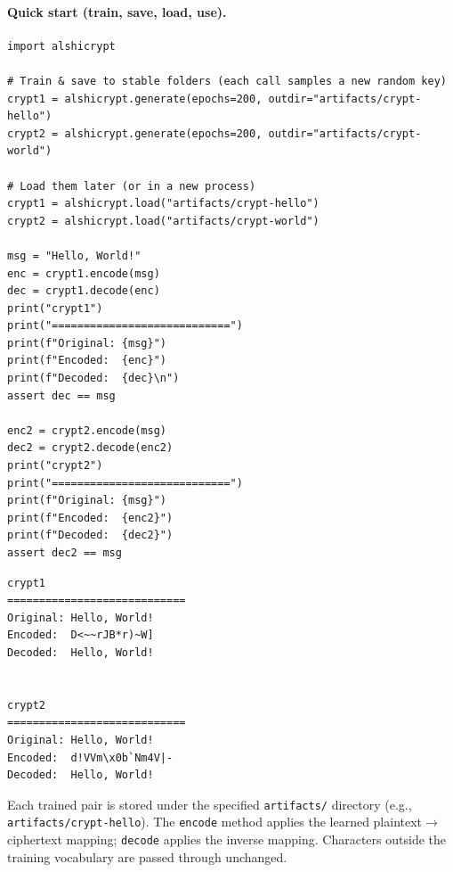 \documentclass[12pt]{article}
\theoremstyle{plain}
\theoremstyle{remark}
\begin{document}
\paragraph{Quick start (train, save, load, use).}
\begin{verbatim}
import alshicrypt

# Train & save to stable folders (each call samples a new random key)
crypt1 = alshicrypt.generate(epochs=200, outdir="artifacts/crypt-hello")
crypt2 = alshicrypt.generate(epochs=200, outdir="artifacts/crypt-world")

# Load them later (or in a new process)
crypt1 = alshicrypt.load("artifacts/crypt-hello")
crypt2 = alshicrypt.load("artifacts/crypt-world")

msg = "Hello, World!"
enc = crypt1.encode(msg)
dec = crypt1.decode(enc)
print("crypt1")
print("============================")
print(f"Original: {msg}")
print(f"Encoded:  {enc}")
print(f"Decoded:  {dec}\n")
assert dec == msg

enc2 = crypt2.encode(msg)
dec2 = crypt2.decode(enc2)
print("crypt2")
print("============================")
print(f"Original: {msg}")
print(f"Encoded:  {enc2}")
print(f"Decoded:  {dec2}")
assert dec2 == msg
\end{verbatim}

\begin{verbatim}
crypt1
============================
Original: Hello, World!
Encoded:  D<~~rJB*r)~W]
Decoded:  Hello, World!


crypt2
============================
Original: Hello, World!
Encoded:  d!VVm\x0b`Nm4V|-
Decoded:  Hello, World!
\end{verbatim}
\noindent Each trained pair is stored under the specified \texttt{artifacts/} directory
(e.g., \texttt{artifacts/crypt-hello}). The \texttt{encode} method applies the learned
plaintext$\rightarrow$ciphertext mapping; \texttt{decode} applies the inverse mapping.
Characters outside the training vocabulary are passed through unchanged.
\end{document}
